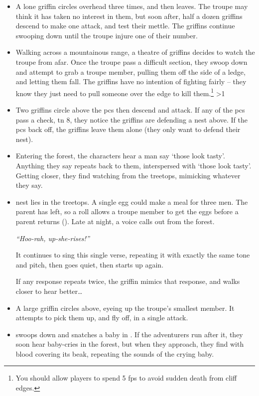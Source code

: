 \begin{multicols}{2}
\begin{itemize}
  \item
  A lone \gls{griffin} circles overhead three times, and then leaves.
  The troupe may think it has taken no interest in them, but soon after, half a dozen \glspl{griffin} descend to make one attack, and test their mettle.
  The \glspl{griffin} continue swooping down until the troupe injure one of their number.
  \item
  Walking across a mountainous range, a theatre of \glspl{griffin} decides to watch the troupe from afar.
  Once the troupe pass a difficult section, they swoop down and attempt to grab a troupe member, pulling them off the side of a ledge, and letting them fall.
  The \glspl{griffin} have no intention of fighting fairly -- they know they just need to pull someone over the edge to kill them.\footnote{You should allow players to spend 5 \glspl{fp} to avoid sudden death from cliff edges.}
  \ifnum\value{temperature}>1
    \item
    Two \glspl{griffin} circle above the \glspl{pc} then descend and attack.
    If any of the \glspl{pc} pass a  check, \gls{tn} 8, they notice the \glspl{griffin} are defending a nest above.
    If the \glspl{pc} back off, the \glspl{griffin} leave them alone (they only want to defend their nest).
  \else
    \item
    Entering the forest, the characters hear a man say `those look tasty'.
    Anything they say repeats back to them, interspersed with `those look tasty'.
    Getting closer, they find  watching from the treetops, mimicking whatever they say.
  \fi
  \item
  \ifodd\value{r4}
     nest lies in the treetops.
    A single egg could make a meal for three men.
    The parent has left, so a  roll allows a troupe member to get the eggs before a parent returns (\tn[9]).
  \else
    Late at night, a voice calls out from the forest.

    \textit{``Hoo-rah, up-she-rises!''}

    It continues to sing this single verse, repeating it with exactly the same tone and pitch, then goes quiet, then starts up again.

    If any response repeats twice, the griffin mimics that response, and walks closer to hear better\ldots
  \fi
  \item
  A large griffin circles above, eyeing up the troupe's smallest member.
  It attempts to pick them up, and fly off, in a single attack.
  \item
   swoops down and snatches a baby in .
  If the adventurers run after it, they soon hear baby-cries in the forest, but when they approach, they find  with blood covering its beak, repeating the sounds of the crying baby.


\end{itemize}
\end{multicols}
